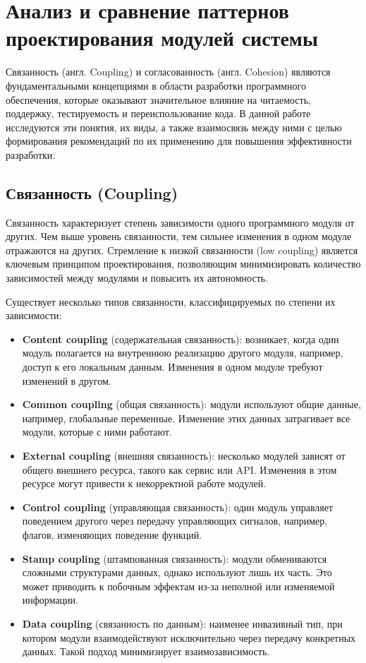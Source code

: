 \section{Анализ и сравнение паттернов проектирования модулей системы}

Связанность (англ. Coupling) и согласованность (англ. Cohesion) являются фундаментальными концепциями в области разработки программного обеспечения, которые оказывают значительное влияние на читаемость, поддержку, тестируемость и переиспользование кода\cite{vernon2013implementing}. В данной работе исследуются эти понятия, их виды, а также взаимосвязь между ними с целью формирования рекомендаций по их применению для повышения эффективности разработки.

\subsection*{Связанность (Coupling)}

Связанность характеризует степень зависимости одного программного модуля от других\cite{fowler1999patterns}. Чем выше уровень связанности, тем сильнее изменения в одном модуле отражаются на других. Стремление к низкой связанности (low coupling) является ключевым принципом проектирования, позволяющим минимизировать количество зависимостей между модулями и повысить их автономность.

Существует несколько типов связанности, классифицируемых по степени их зависимости:

\begin{itemize}
    \item \textbf{Content coupling} (содержательная связанность): возникает, когда один модуль полагается на внутреннюю реализацию другого модуля, например, доступ к его локальным данным. Изменения в одном модуле требуют изменений в другом.
    \item \textbf{Common coupling} (общая связанность): модули используют общие данные, например, глобальные переменные. Изменение этих данных затрагивает все модули, которые с ними работают.
    \item \textbf{External coupling} (внешняя связанность): несколько модулей зависят от общего внешнего ресурса, такого как сервис или API. Изменения в этом ресурсе могут привести к некорректной работе модулей.
    \item \textbf{Control coupling} (управляющая связанность): один модуль управляет поведением другого через передачу управляющих сигналов, например, флагов, изменяющих поведение функций.
    \item \textbf{Stamp coupling} (штампованная связанность): модули обмениваются сложными структурами данных, однако используют лишь их часть. Это может приводить к побочным эффектам из-за неполной или изменяемой информации.
    \item \textbf{Data coupling} (связанность по данным): наименее инвазивный тип, при котором модули взаимодействуют исключительно через передачу конкретных данных. Такой подход минимизирует взаимозависимость.
\end{itemize}

